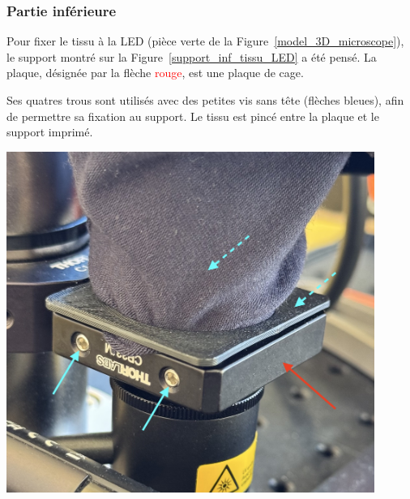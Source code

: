 \subsubsection{Partie inférieure}
\begin{minipage}[c]{0.48\textwidth}
    Pour fixer le tissu à la LED (pièce \textcolor[RGB]{70, 170, 70}{verte} de la Figure~\ref{model_3D_microscope}), le support montré sur la Figure~\ref{support_inf_tissu_LED} a été pensé. La plaque, désignée par la flèche \textcolor{red}{rouge}, est une plaque de cage.

    \vspace{1em}
    Ses quatres trous sont utilisés avec des petites vis sans tête (flèches \textcolor[RGB]{115, 210, 210}{bleues}), afin de permettre sa fixation au support. Le tissu est pincé entre la plaque et le support imprimé.
\end{minipage}\hfill
\begin{minipage}[c]{0.48\textwidth}
    \begin{center}
        \includegraphics[width=0.9\textwidth]{assets/figures/Protections_laser/Securite_mecanique/Protection_vers_microscope/support_inf_tissu_LED.jpeg}
    \end{center}
    \label{support_inf_tissu_LED}
\end{minipage}

